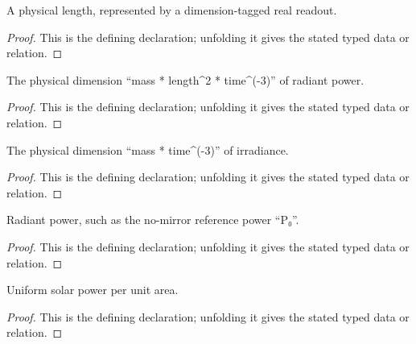 \begin{definition}[PhysicalLength]
  \label{decl:physics:IPhO_2026_2_B_1:PhysicalLength}
  A physical length, represented by a dimension-tagged real readout.
\end{definition}
\begin{proof}
  This is the defining declaration; unfolding it gives the stated typed data or relation.
\end{proof}

\begin{definition}[radiantPowerDimension]
  \label{decl:physics:IPhO_2026_2_B_1:radiantPowerDimension}
  The physical dimension “mass * length\textasciicircum{}2 * time\textasciicircum{}(-3)” of radiant power.
\end{definition}
\begin{proof}
  This is the defining declaration; unfolding it gives the stated typed data or relation.
\end{proof}

\begin{definition}[solarIntensityDimension]
  \label{decl:physics:IPhO_2026_2_B_1:solarIntensityDimension}
  The physical dimension “mass * time\textasciicircum{}(-3)” of irradiance.
\end{definition}
\begin{proof}
  This is the defining declaration; unfolding it gives the stated typed data or relation.
\end{proof}

\begin{definition}[RadiantPower]
  \label{decl:physics:IPhO_2026_2_B_1:RadiantPower}
  Radiant power, such as the no-mirror reference power “P₀”.
\end{definition}
\begin{proof}
  This is the defining declaration; unfolding it gives the stated typed data or relation.
\end{proof}

\begin{definition}[SolarIntensity]
  \label{decl:physics:IPhO_2026_2_B_1:SolarIntensity}
  Uniform solar power per unit area.
\end{definition}
\begin{proof}
  This is the defining declaration; unfolding it gives the stated typed data or relation.
\end{proof}


